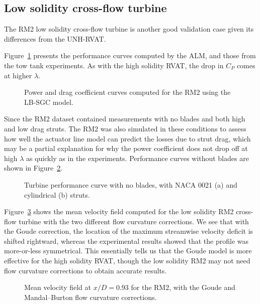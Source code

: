 \subsection{Low solidity cross-flow turbine}

The RM2 low solidity cross-flow turbine is another good validation case given
its differences from the UNH-RVAT. 


Figure~\ref{fig:RM2-ALM-perf-curves} presents
the performance curves computed by the ALM, and those from the tow tank
experiments. As with the high solidity RVAT, the drop in $C_P$ comes at higher
$\lambda$.

\begin{figure}
    \caption{Power and drag coefficient curves computed for the RM2 using the
        LB-SGC model.}
    
    \label{fig:RM2-ALM-perf-curves}
\end{figure}

Since the RM2 dataset contained measurements with no blades and both high and
low drag struts. The RM2 was also simulated in these conditions to assess how
well the actuator line model can predict the losses due to strut drag, which may
be a partial explanation for why the power coefficient does not drop off at high
$\lambda$ as quickly as in the experiments. Performance curves without blades
are shown in Figure~\ref{fig:RM2-ALM-strut-perf}.

\begin{figure}
    \caption{Turbine performance curve with no blades, with NACA 0021 (a) and
        cylindrical (b) struts.}
    
    \label{fig:RM2-ALM-strut-perf}
\end{figure}

Figure~\ref{fig:RM2-ALM-flow-curvature} shows the mean velocity field computed
for the low solidity RM2 cross-flow turbine with the two different flow
curvature corrections. We see that with the Goude correction, the location of
the maximum streamwise velocity deficit is shifted rightward, whereas the
experimental results showed that the profile was more-or-less symmetrical. This
essentially tells us that the Goude model is more effective for the high
solidity RVAT, though the low solidity RM2 may not need flow curvature
corrections to obtain accurate results.

\begin{figure}
    \caption{Mean velocity field at $x/D=0.93$ for the RM2, with the Goude and
        Mandal--Burton flow curvature corrections.}
    
    \label{fig:RM2-ALM-flow-curvature}
\end{figure}


